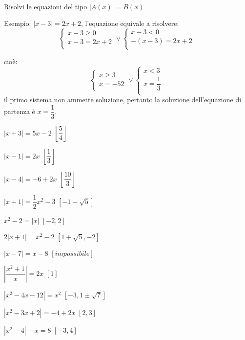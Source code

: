 \begin{esercizio}\label{ese:03.1}
\noindent Risolvi le equazioni del tipo \(|A(x)|=B(x)\)

Esempio:
\(|x-3|=2x+2\), l'equazione equivale a risolvere:
\[
\left\lbrace 
\begin{array}{l}
x-3\geq 0 \\
x-3=2x+2\\
\end{array}
\right.
\vee
\left\lbrace 
\begin{array}{l}
x-3< 0 \\
-(x-3)=2x+2\\
\end{array}
\right.
\]      

cioè:
\[
\left\lbrace 
\begin{array}{l}
x\geq 3 \\
x=-52\\
\end{array}
\right.
\vee
\left\lbrace 
\begin{array}{l}
x< 3 \\
x=\dfrac{1}{3}\\
\end{array}
\right.
\]
il primo sistema non ammette soluzione, pertanto la soluzione dell'equazione 
di 
partenza è \(    x=\dfrac{1}{3}\).
\begin{multicols}{2}
\begin{enumeratea}
\item \(\left| x+3 \right| =5x-2 \) \hfill \(\left[ \dfrac{5}{4}\right] \)
\item \(\left| x-1 \right| =2x \) \hfill \(\left[ \dfrac{1}{3}\right] \)
\item \(\left| x-4 \right| =-6+2x \) \hfill \(\left[ \dfrac{10}{3}\right] \)
\item \(\left| x+1 \right| =\dfrac{1}{2}x^2-3 \) \hfill \(\left[ 
-1-\sqrt{5}\right] 
\)
\item \(x^2-2= \left| x \right| \) \hfill \(\left[ -2, 2\right] \)
\item \(2\left| x+1 \right| =x^2-2 \) \hfill \(\left[1+\sqrt{5}, -2\right] \)
\item \(\left| x-7 \right| =x-8 \) \hfill \(\left[ impossibile\right] \)
\item \(\left| \dfrac{x^2+1}{x} \right| =2x \) \hfill \(\left[ 1 \right] \)
\item \(\left| x^2-4x-12 \right| =x^2 \) \hfill \(\left[ -3, 1\pm 
\sqrt{7}\right] \)
\item \(\left| x^2-3x+2 \right| =-4+2x \) \hfill \(\left[ 2, 3\right] \)
\item \(\left| x^2-4 \right| -x=8 \) \hfill \(\left[ -3, 4\right] \)
\end{enumeratea}
\end{multicols}
\end{esercizio}

